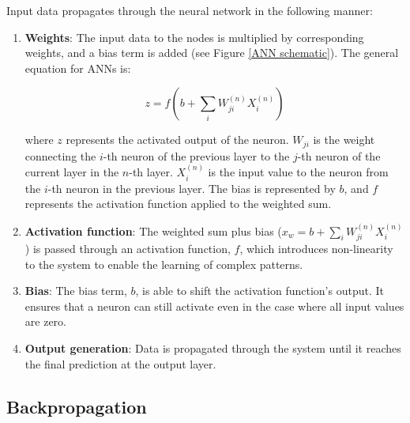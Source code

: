 Input data propagates through the neural network in the following manner:
\begin{enumerate}
	\item \textbf{Weights}: The input data to the nodes is multiplied by corresponding weights, and a bias term is added (see Figure \ref{ANN schematic}). The general equation for ANNs is:
	
	\begin{equation}\label{Generalized ANN1}
		z = f(b+\sum_i W_{j i}^{(n)} X_i^{(n)})
	\end{equation}
	
	where $z$ represents the activated output of the neuron. $W_{j i}$ is the weight connecting the $i$-th neuron of the previous layer to the $j$-th neuron of the current layer in the $n$-th layer. $X_i^{(n)}$ is the input value to the neuron from the $i$-th neuron in the previous layer. The bias is represented by $b$, and $f$ represents the activation function applied to the weighted sum.
	
	\item \textbf{Activation function}: The weighted sum plus bias ($x_w = b+\sum_i W_{j i}^{(n)} X_i^{(n)}$) is passed through an activation function, $f$, which introduces non-linearity to the system to enable the learning of complex patterns.
	
	\item \textbf{Bias}: The bias term, $b$, is able to shift the activation function's output. It ensures that a neuron can still activate even in the case where all input values are zero.
	
	\item \textbf{Output generation}: Data is propagated through the system until it reaches the final prediction at the output layer.
\end{enumerate}

\subsection{Backpropagation}

